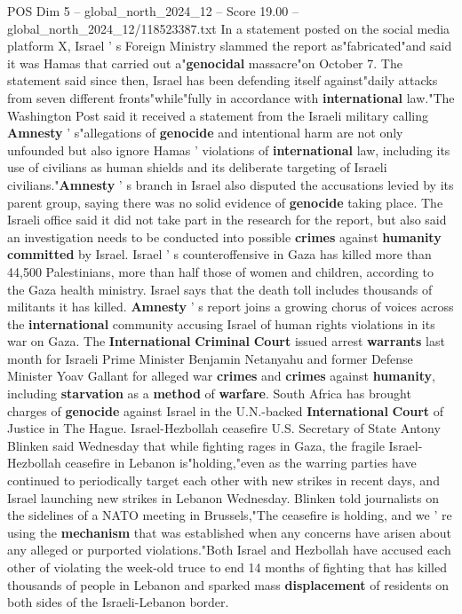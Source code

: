 \begin{textsample}{POS Dim 5 – global\_north\_2024\_12 – Score 19.00 – global\_north\_2024\_12/118523387.txt}
In a statement posted on the social media platform X, Israel ' s Foreign Ministry slammed the report as"fabricated"and said it was Hamas that carried out a"\textbf{genocidal} massacre"on October 7.
The statement said since then, Israel has been defending itself against"daily attacks from seven different fronts"while"fully in accordance with \textbf{international} law."The Washington Post said it received a statement from the Israeli military calling \textbf{Amnesty} ' s"allegations of \textbf{genocide} and intentional harm are not only unfounded but also ignore Hamas ' violations of \textbf{international} law, including its use of civilians as human shields and its deliberate targeting of Israeli civilians."\textbf{Amnesty} ' s branch in Israel also disputed the accusations levied by its parent group, saying there was no solid evidence of \textbf{genocide} taking place.
The Israeli office said it did not take part in the research for the report, but also said an investigation needs to be conducted into possible \textbf{crimes} against \textbf{humanity} \textbf{committed} by Israel.
Israel ' s counteroffensive in Gaza has killed more than 44,500 Palestinians, more than half those of women and children, according to the Gaza health ministry.
Israel says that the death toll includes thousands of militants it has killed. \textbf{Amnesty} ' s report joins a growing chorus of voices across the \textbf{international} community accusing Israel of human rights violations in its war on Gaza.
The \textbf{International} \textbf{Criminal} \textbf{Court} issued arrest \textbf{warrants} last month for Israeli Prime Minister Benjamin Netanyahu and former Defense Minister Yoav Gallant for alleged war \textbf{crimes} and \textbf{crimes} against \textbf{humanity}, including \textbf{starvation} as a \textbf{method} of \textbf{warfare}.
South Africa has brought charges of \textbf{genocide} against Israel in the U.N.-backed \textbf{International} \textbf{Court} of Justice in The Hague.
Israel-Hezbollah ceasefire U.S.
Secretary of State Antony Blinken said Wednesday that while fighting rages in Gaza, the fragile Israel-Hezbollah ceasefire in Lebanon is"holding,"even as the warring parties have continued to periodically target each other with new strikes in recent days, and Israel launching new strikes in Lebanon Wednesday.
Blinken told journalists on the sidelines of a NATO meeting in Brussels,"The ceasefire is holding, and we ' re using the \textbf{mechanism} that was established when any concerns have arisen about any alleged or purported violations."Both Israel and Hezbollah have accused each other of violating the week-old truce to end 14 months of fighting that has killed thousands of people in Lebanon and sparked mass \textbf{displacement} of residents on both sides of the Israeli-Lebanon border.

\end{textsample}
